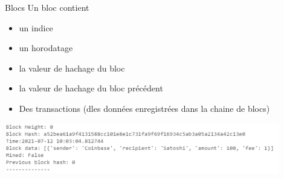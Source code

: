 \documentclass{beamer}
\begin{document}
\begin{frame}{Blocs}
Un bloc contient
\begin{itemize}
  \item un indice 
  \item un horodatage
  \item la valeur de hachage du bloc
  \item la valeur de hachage du bloc précédent
  \item Des transactions (dles données enregistrées dans la chaine de blocs)
\end{itemize}
\begin{center}
\includegraphics[width=0.9\textwidth]{../../Figures/genesis_block.png}
\end{center}
\end{frame}
\end{document}
